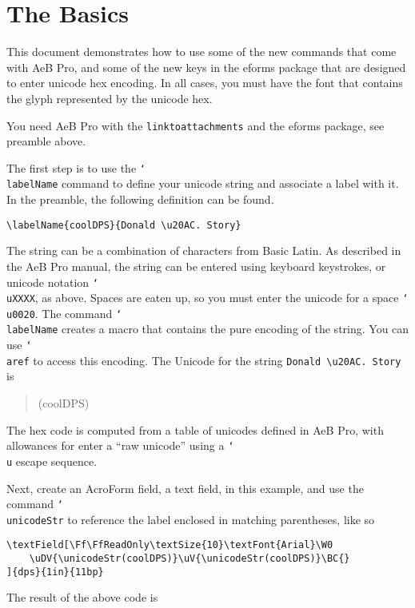 \documentclass{article}
\newcommand{\cs}[1]{\texttt{\char`\\#1}}
\begin{document}
\makeinlinetitle

\section{The Basics}

This document demonstrates how to use some of the new commands that
come with AeB Pro, and some of the new keys in the eforms package
that are designed to enter unicode hex encoding. In all cases, you must have
the font that contains the glyph represented by the unicode hex.

You need AeB Pro with the \texttt{linktoattachments} and the eforms package, see
preamble above.

The first step is to use the \cs{labelName} command to define your unicode string
and associate a label with it. In the preamble, the following definition can be found.
\begin{verbatim}
\labelName{coolDPS}{Donald \u20AC. Story}
\end{verbatim}
The string can be a combination of characters from Basic Latin. As
described in the AeB Pro manual, the string can be entered using
keyboard keystrokes, or unicode notation \cs{uXXXX}, as above.
Spaces are eaten up, so you must enter the unicode for a space
\cs{u0020}. The command \cs{labelName} creates a macro that contains
the pure encoding of the string. You can use \cs{aref} to access
this encoding.
The Unicode for the string \verb!Donald \u20AC. Story! is
\begin{quote}
\unicodeStr(coolDPS)
\end{quote}
The hex code is computed from a table of unicodes defined in AeB Pro, with allowances for enter
a ``raw unicode'' using a \cs{u} escape sequence.

Next, create an AcroForm field, a text field, in this example, and
use the command \cs{unicodeStr} to reference the label enclosed
in matching parentheses, like so
\begin{verbatim}
\textField[\Ff\FfReadOnly\textSize{10}\textFont{Arial}\W0
    \uDV{\unicodeStr(coolDPS)}\uV{\unicodeStr(coolDPS)}\BC{}
]{dps}{1in}{11bp}
\end{verbatim}
The result of the above code is

\end{document}
